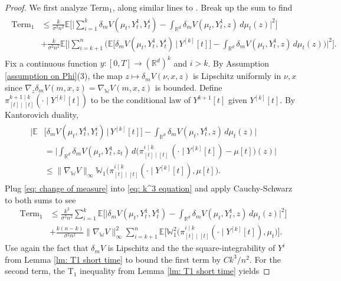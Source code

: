 \documentclass[11pt,reqno]{amsart}
\numberwithin{equation}{section}
\theoremstyle{definition}
\def\E{{\mathbb E}}
\def\R{{\mathbb R}}
\newcommand{\wgrad}{\nabla_{\W}}
\newcommand{\W}{\mathbb W}
\begin{document}
\begin{proof}
We first analyze Term$_1$, along similar lines to \cite{HierarchiesPaper}.
Break up the sum to find
\begin{align}
\label{eq: k^3 equation}
\begin{split}
    \text{Term}_1&\leq \frac{k}{\sigma^2 n^2}\E\bigg[\Big |\sum_{i=1}^k  \delta_m V(\mu_t,Y_t^1,Y_t^{i})-\int_{\R^d}\delta_m V(\mu_t,Y_t^1,z)\,d\mu_t(z) \Big |^2\bigg]\\
    &+  \frac{k}{\sigma^2 n^2}\E\bigg[\bigg | \sum_{i=k+1}^n\bigg(\E\Big[ \delta_m V(\mu_t, Y_t^1,Y_t^{i})\,\Big\vert\, Y^{[k]}[t]\Big]-\int_{\R^d}\delta_m V(\mu_t,Y_t^1,z)\,d\mu_t(z)\bigg)\bigg |^2\bigg].
\end{split}
\end{align}
Fix a continuous function $y:[0,T]\to (\R^{d})^{k}$ and $i>k$. By Assumption \ref{assumption on Phi}(3), the map $z\mapsto \delta_m V(\nu, x,z)$ is Lipschitz uniformly in $\nu,x$ since $\nabla_z \delta_m  V(m,x,z)=\wgrad  V(m,x,z)$ is bounded. Define $\pi^{k+1\mid k}_{[t]\mid [t]}(\cdot \mid Y^{[k]}[t])$ to be the conditional law of $Y^{k+1}[t]$ given $Y^{[k]}[t]$. By Kantorovich duality,
\begin{align}
\label{eq: change of measure}
\begin{split}
\bigg|\E&\bigg[ \delta_m V(\mu_t, Y_t^1,Y_t^{i})\,\Big\vert\, Y^{[k]}[t]\bigg]-\int_{\R^d}\delta_m V(\mu_t,Y_t^1,z)\,d\mu_t(z)\bigg|\\
&=\bigg|\int_{\R^d} \delta_m  V(\mu_t,Y_t^1,z_t) \,d\Big(\pi_{[t]\mid [t]}^{i \mid k}\,(\cdot \mid Y^{[k]}[t])-\mu[t]\Big)(z)\bigg|\\
&\leq \|\wgrad V\|_\infty \W_1\big(\pi_{[t]\mid [t]}^{i \mid k}(\cdot \mid Y^{[k]}[t]),\mu[t]\big).
\end{split}
\end{align}
Plug \ref{eq: change of measure} into \ref{eq: k^3 equation} and apply Cauchy-Schwarz to both sums to see 
\begin{align*}
   \text{Term}_1&\leq \frac{k^2}{\sigma^2 n^2}\sum_{i=1}^k\E\bigg[\Big |\delta_m  V(\mu_t,Y_t^1,Y_t^1)-\int_{\R^d}\delta_m  V(\mu_t,Y_t^1,z)\,d\mu_t(z)\Big |^2\bigg]\\ 
    &+\frac{k (n-k)}{\sigma^2 n^2}\|\wgrad V\|_\infty^2\sum_{i=k+1}^n\E\Big[   \W_1^2\big(\pi_{[t]\mid [t]}^{i \mid k}(\cdot \mid Y^{[k]}[t]),\mu_t\big) \Big].
    \end{align*}
    Use again the fact that $\delta_m V$ is Lipschitz and the the square-integrability of $Y^i$ from Lemma \ref{lm: T1 short time} to bound the first term by $Ck^3/n^2$. For the second term, the T$_1$ inequality from Lemma \ref{lm: T1 short time} yields

\end{proof}
\end{document}
